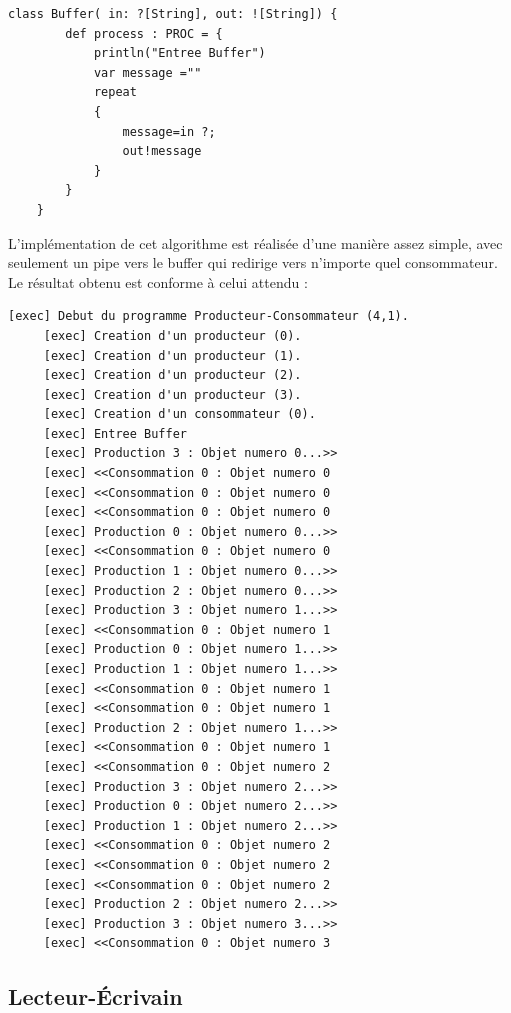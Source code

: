 \documentclass[a4paper,11pt,french]{report}
\begin{document}
\begin{lstlisting}[frame=trBL,title={Producteurs-Consommateurs : Buffer}, firstnumber=last]    
    class Buffer( in: ?[String], out: ![String]) {
        def process : PROC = {
            println("Entree Buffer")
            var message =""
            repeat 
            {
                message=in ?; 
                out!message
            }
        }
    }
\end{lstlisting} 

L'implémentation de cet algorithme est réalisée d'une manière assez simple, avec seulement un pipe vers le buffer qui redirige vers n'importe quel consommateur.\\
Le résultat obtenu est conforme à celui attendu :

\begin{lstlisting}[frame=trBL,title={Producteurs-Consommateurs : Résultat de l'éxécution}, firstnumber=last]   
     [exec] Debut du programme Producteur-Consommateur (4,1).
     [exec] Creation d'un producteur (0).
     [exec] Creation d'un producteur (1).
     [exec] Creation d'un producteur (2).
     [exec] Creation d'un producteur (3).
     [exec] Creation d'un consommateur (0).
     [exec] Entree Buffer
     [exec] Production 3 : Objet numero 0...>>
     [exec] <<Consommation 0 : Objet numero 0
     [exec] <<Consommation 0 : Objet numero 0
     [exec] <<Consommation 0 : Objet numero 0
     [exec] Production 0 : Objet numero 0...>>
     [exec] <<Consommation 0 : Objet numero 0
     [exec] Production 1 : Objet numero 0...>>
     [exec] Production 2 : Objet numero 0...>>
     [exec] Production 3 : Objet numero 1...>>
     [exec] <<Consommation 0 : Objet numero 1
     [exec] Production 0 : Objet numero 1...>>
     [exec] Production 1 : Objet numero 1...>>
     [exec] <<Consommation 0 : Objet numero 1
     [exec] <<Consommation 0 : Objet numero 1
     [exec] Production 2 : Objet numero 1...>>
     [exec] <<Consommation 0 : Objet numero 1
     [exec] <<Consommation 0 : Objet numero 2
     [exec] Production 3 : Objet numero 2...>>
     [exec] Production 0 : Objet numero 2...>>
     [exec] Production 1 : Objet numero 2...>>
     [exec] <<Consommation 0 : Objet numero 2
     [exec] <<Consommation 0 : Objet numero 2
     [exec] <<Consommation 0 : Objet numero 2
     [exec] Production 2 : Objet numero 2...>>
     [exec] Production 3 : Objet numero 3...>>
     [exec] <<Consommation 0 : Objet numero 3
\end{lstlisting} 

\subsection{Lecteur-\'Ecrivain}
\end{document}
